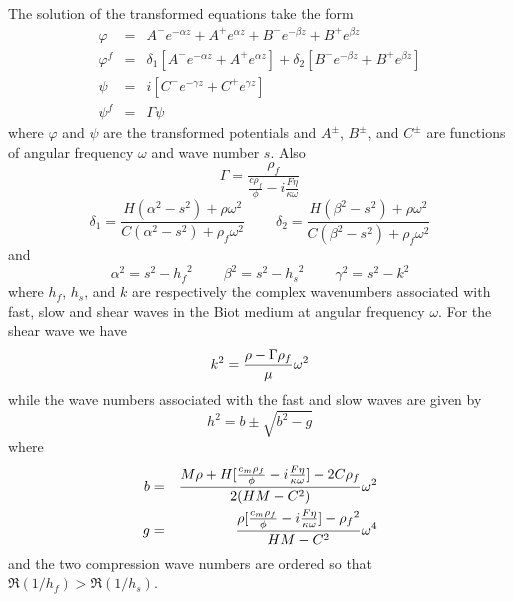 The solution of the transformed equations take the form
\begin{eqnarray*}
\varphi & = & A^- e^{-\alpha z} + A^+ e^{\alpha z} + B^- e^{-\beta z} +
B^+ e^{\beta z} \\
\varphi^f & = & \delta_1 [ A^- e^{-\alpha z} + A^+ e^{\alpha z}] +
\delta_2 [ B^- e^{-\beta z} +
B^+ e^{\beta z} ] \\
\psi & = & i [ C^- e^{-\gamma z} + C^+ e^{\gamma z}] \\
\psi^f & = & \Gamma \psi
\end{eqnarray*}
where $\varphi$ and $\psi$ are the transformed potentials and
$A^{\pm}$, $B^{\pm}$,
and $C^{\pm}$ are functions of angular frequency $\omega$ and wave
number $s$.
Also
$$
\Gamma = \frac{\rho_f}{\frac{c \rho_f}{\phi} - i \frac{F
\eta}{\kappa \omega} }
$$
$$
\delta_1 = \frac{ H ( \alpha^2 - s^2 ) + \rho \omega^2}{C ( \alpha^2 -
s^2 ) + \rho_f \omega^2 } ~~~~~~~~~~
\delta_2 = \frac{ H ( \beta^2 - s^2 ) + \rho \omega^2}{C ( \beta^2 -
s^2 ) + \rho_f \omega^2 }
$$
and
$$
\alpha^2 = s^2 - {h_f}^2 ~~~~~~~~~~
\beta^2 = s^2 - {h_s}^2 ~~~~~~~~~~
\gamma^2 = s^2 - k^2
$$
where  $h_f$, $h_s$, and $k$  are respectively the complex wavenumbers
associated with fast, slow and shear waves in the Biot medium at
angular frequency  $\omega$.  For the shear wave we have
$$
k^2 = \frac{\rho - \Gamma \rho_f}{\mu} \/ \omega^2
$$
while the wave numbers associated with the fast and slow waves are
given by
$$
h^2 = b \pm \sqrt{ b^2 - g }
$$
where
\begin{eqnarray*}
b & = & \frac{M \rho + H [
\frac{c_m \rho_f}{\phi} - i \frac{ F \eta}{\kappa \omega} ]
- 2 C \rho_f}
{2(H M - C^2)}\/ \omega^2 \\
g & = & \frac{\rho [ \frac{c_m \rho_f}{\phi} - i \frac{F \eta
}{\kappa \omega }] - {\rho_f}^2}{H M - C^2} \/ \omega^4
\end{eqnarray*}
and the two compression wave numbers are ordered so that
$\Re (1/h_f) > \Re (1/h_s)$.

